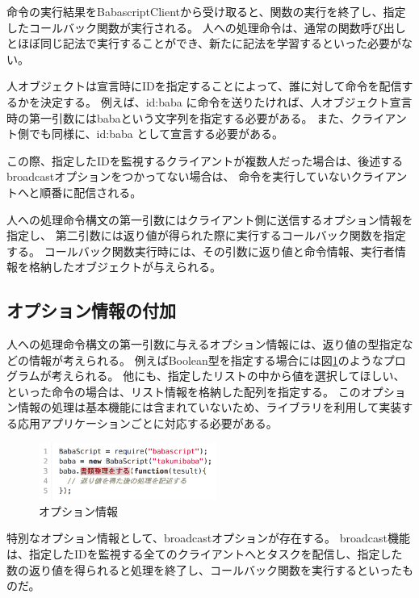 命令の実行結果をBabascriptClientから受け取ると、関数の実行を終了し、指定したコールバック関数が実行される。
人への処理命令は、通常の関数呼び出しとほぼ同じ記法で実行することができ、新たに記法を学習するといった必要がない。

人オブジェクトは宣言時にIDを指定することによって、誰に対して命令を配信するかを決定する。
例えば、id:baba
に命令を送りたければ、人オブジェクト宣言時の第一引数にはbabaという文字列を指定する必要がある。
また、クライアント側でも同様に、id:baba として宣言する必要がある。

この際、指定したIDを監視するクライアントが複数人だった場合は、後述するbroadcastオプションをつかってない場合は、
命令を実行していないクライアントへと順番に配信される。

人への処理命令構文の第一引数にはクライアント側に送信するオプション情報を指定し、
第二引数には返り値が得られた際に実行するコールバック関数を指定する。
コールバック関数実行時には、その引数に返り値と命令情報、実行者情報を格納したオブジェクトが与えられる。

\subsection{オプション情報の付加}\label{ux30aaux30d7ux30b7ux30e7ux30f3ux60c5ux5831ux306eux4ed8ux52a0}

人への処理命令構文の第一引数に与えるオプション情報には、返り値の型指定などの情報が考えられる。
例えばBoolean型を指定する場合には図\ref{script_02}のようなプログラムが考えられる。
他にも、指定したリストの中から値を選択してほしい、といった命令の場合は、リスト情報を格納した配列を指定する。
このオプション情報の処理は基本機能には含まれていないため、ライブラリを利用して実装する応用アプリケーションごとに対応する必要がある。

\begin{figure}[h]
  \centering  
  \includegraphics[width=220px]{./images/script_02.png}
  \caption{オプション情報}
  \label{script_02}
\end{figure}

特別なオプション情報として、broadcastオプションが存在する。
broadcast機能は、指定したIDを監視する全てのクライアントへとタスクを配信し、指定した数の返り値を得られると処理を終了し、コールバック関数を実行するといったものだ。

